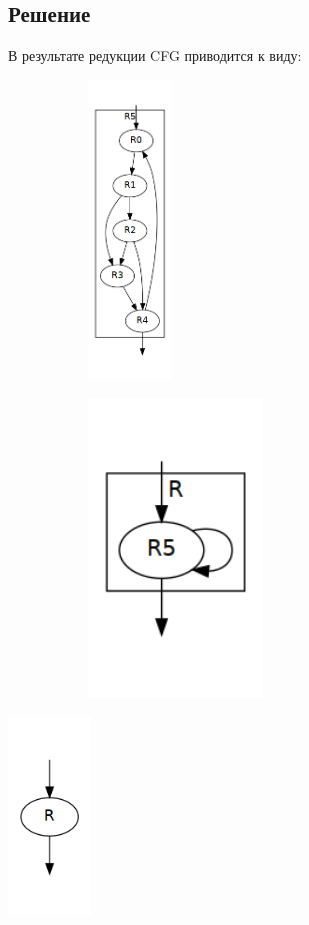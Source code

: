 \documentclass[11pt]{article}
\begin{document}
\subsection{Решение}
\label{sec:org682a74b}
В результате редукции CFG приводится к виду:
\begin{figure}[h]
\caption{Редукция CFG, шаг 1}
\label{pic:pic1}
\begin{subfigure}{0.5\textwidth}
\includegraphics[height=300px]{regions5.png}

\end{subfigure}
\begin{subfigure}{0.5\textwidth}

\includegraphics[height=300px]{regions6.png}

\end{subfigure}
\end{figure}
\pagebreak
\begin{center}
\includegraphics[height=200px]{region7.png}
\end{center}
\end{document}
